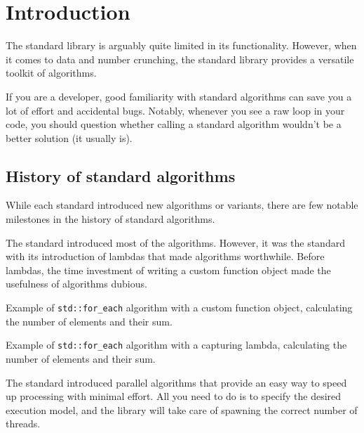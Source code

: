 \chapter{Introduction}

The \CC standard library is arguably quite limited in its functionality. However, when it comes to data and number crunching, the \CC standard library provides a versatile toolkit of algorithms.

If you are a \CC developer, good familiarity with \CC standard algorithms can save you a lot of effort and accidental bugs. Notably, whenever you see a raw loop in your code, you should question whether calling a standard algorithm wouldn't be a better solution (it usually is).

\section{History of standard \texorpdfstring{\CC}{C++} algorithms}

While each \CC standard introduced new algorithms or variants, there are few notable milestones in the history of \CC standard algorithms.

The  standard introduced most of the algorithms. However, it was the  standard with its introduction of lambdas that made algorithms worthwhile. Before lambdas, the time investment of writing a custom function object made the usefulness of algorithms dubious.

\begin{box-note}
\footnotesize Example of \texttt{std::for_each} algorithm with a custom function object, calculating the number of elements and their sum.
\tcblower
{}
\end{box-note}

\begin{box-note}
\footnotesize Example of \texttt{std::for_each} algorithm with a capturing lambda, calculating the number of elements and their sum.
\tcblower
{}
\end{box-note}

The  standard introduced parallel algorithms that provide an easy way to speed up processing with minimal effort. All you need to do is to specify the desired execution model, and the library will take care of spawning the correct number of threads.



